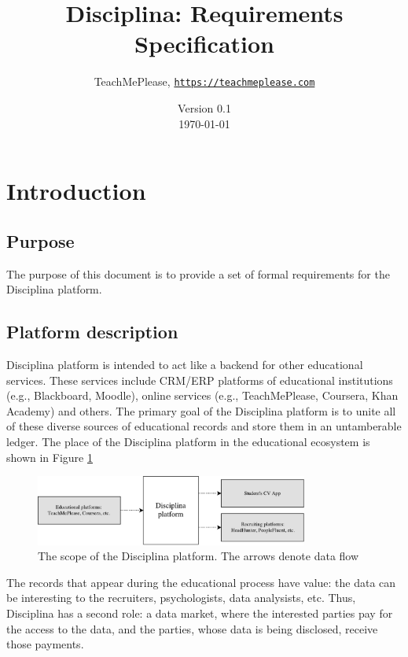 \documentclass[a4paper]{article}
\title{Disciplina: Requirements Specification}
\author{TeachMePlease, \href{https://teachmeplease.com}{\texttt{https://teachmeplease.com}}}
\date{%
Version 0.1\\%
\today
}
\begin{document}
\maketitle

\section{Introduction}
\subsection{Purpose}
The purpose of this document is to provide a set of formal requirements for the Disciplina platform.

\subsection{Platform description}
Disciplina platform is intended to act like a backend for other educational services. These services include CRM/ERP platforms of educational institutions (e.g., Blackboard, Moodle), online services (e.g., TeachMePlease, Coursera, Khan Academy) and others. The primary goal of the Disciplina platform is to unite all of these diverse sources of educational records and store them in an untamberable ledger. The place of the Disciplina platform in the educational ecosystem is shown in Figure \ref{fig:scope}

\begin{figure}[ht]
  \centering
  \includegraphics[width=0.8\textwidth]{disciplina-scope}
  \caption{The scope of the Disciplina platform. The arrows denote data flow}
  \label{fig:scope}
\end{figure}

The records that appear during the educational process have value: the data can be interesting to the recruiters, psychologists, data analysists, etc. Thus, Disciplina has a second role: a data market, where the interested parties pay for the access to the data, and the parties, whose data is being disclosed, receive those payments.
\end{document}
